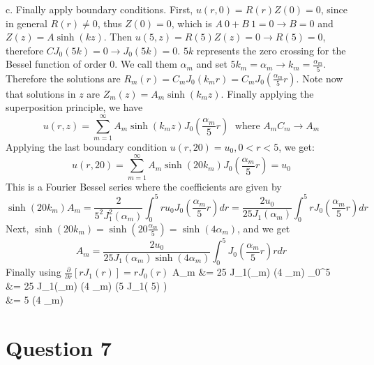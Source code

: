 \documentclass[12pt,twoside]{article}
\begin{document}
\item [c.]
Finally apply boundary conditions.
First, $u(r,0)= R(r) Z(0)=0$, since in general $R(r) \neq 0$, thus $Z(0)=0$, which is $A ~ 0 + B ~ 1 = 0 \rightarrow B = 0$
and $Z(z) = A \sinh(k z)$.
Then $u(5,z) = R(5) Z(z) = 0 \rightarrow R(5) = 0 $, therefore $C J_0(5k) = 0 \rightarrow J_0(5k) = 0$. $5k$ represents the zero crossing for the Bessel function of order 0.
We call them $\alpha_m$ and set $5k_m = \alpha_m  \rightarrow  k_m = \frac{\alpha_m}{5}$. Therefore the solutions are $R_m(r) = C_m J_0(k_m r) = C_m J_0(\frac{\alpha_m}{5} r)$.
Note now that solutions in $z$ are $Z_m(z) = A_m \sinh(k_m z)$. Finally applying the superposition principle, we have
\[
	u(r, z) = \sum_{m=1}^\infty A_m \sinh(k_m z) J_0(\frac{\alpha_m}{5} r) \; \text{ where  } A_m C_m \rightarrow A_m
\]
Applying the last boundary condition $u(r, 20) = u_0, 0 < r < 5$, we get:
\[
	u(r, 20) = \sum_{m=1}^\infty A_m \sinh(20 k_m) J_0(\frac{\alpha_m}{5} r) = u_0
\]
This is a Fourier Bessel series where the coefficients are given by
\[
	 \sinh(20 k_m) A_m = \frac{2} {5^2 J_1^2(\alpha_m)} \int_0^5 r u_0  J_0(\frac{\alpha_m}{5} r) dr =  \frac{2 u_0} {25 J_1(\alpha_m)} \int_0^5 r J_0(\frac{\alpha_m}{5} r) dr
\]
Next, $\sinh(20 k_m) =  \sinh(20 \frac{\alpha_m}{5}) =  \sinh(4 \alpha_m)$, and we get
\[
	 A_m = \frac{2 u_0} {25 J_1(\alpha_m)  \sinh(4 \alpha_m)} \int_0^5 J_0(\frac{\alpha_m}{5} r) r dr 
\]
Finally using $\frac{\partial}{\partial r} [ r J_1(r)] = r J_0(r)$ 
\ba
	 A_m		&=  {25 J_1(\alpha_m)  \sinh(4 \alpha_m)} _0^5 \\
	 	 	&=  {25 J_1(\alpha_m)  \sinh(4 \alpha_m)} \bigg (5 J_1( 5) \bigg ) \\
	 		&=  {5 \sinh(4 \alpha_m)}
\ea

\ee

\section*{Question 7}
\be
\end{document}
